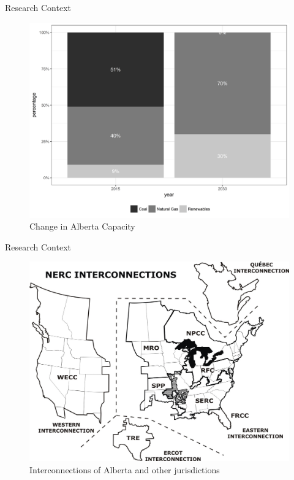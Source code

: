 \documentclass[newPxFont,numfooter,progressbar,sectionpages]{beamer}
\begin{document}

\begin{frame}[c]{Research Context}


\begin{figure}
	\centering
	\includegraphics[width=0.8\linewidth]{"figure/capacity"}
	\caption{Change in Alberta Capacity}
	\label{fig:abensource}
\end{figure}



\end{frame}




\begin{frame}[c]{Research Context}


\begin{figure}
	\centering
	\includegraphics[width=0.8\linewidth]{"figure/Interconnection"}
	\caption{Interconnections of Alberta and other jurisdictions}
	\label{fig:Interconnection}
\end{figure}



\end{frame}
\end{document}
